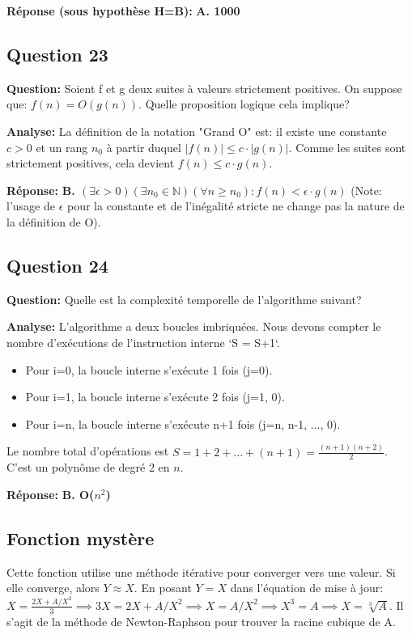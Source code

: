 \documentclass[12pt,a4paper]{article}
\begin{document}
\textbf{Réponse (sous hypothèse H=B):} \textbf{A. 1000}

\subsection{Question 23}
\textbf{Question:} Soient f et g deux suites à valeurs strictement positives. On suppose que: $f(n)=O(g(n))$. Quelle proposition logique cela implique?

\textbf{Analyse:} La définition de la notation "Grand O" est: il existe une constante $c > 0$ et un rang $n_0$ à partir duquel $|f(n)| \le c \cdot |g(n)|$. Comme les suites sont strictement positives, cela devient $f(n) \le c \cdot g(n)$.

\textbf{Réponse:} \textbf{B. $(\exists \epsilon > 0)(\exists n_0 \in \mathbb{N})(\forall n \ge n_0): f(n) < \epsilon \cdot g(n)$} (Note: l'usage de $\epsilon$ pour la constante et de l'inégalité stricte ne change pas la nature de la définition de O).

\subsection{Question 24}
\textbf{Question:} Quelle est la complexité temporelle de l'algorithme suivant?

\textbf{Analyse:} L'algorithme a deux boucles imbriquées. Nous devons compter le nombre d'exécutions de l'instruction interne `S = S+1`.
\begin{itemize}
    \item Pour i=0, la boucle interne s'exécute 1 fois (j=0).
    \item Pour i=1, la boucle interne s'exécute 2 fois (j=1, 0).
    \item Pour i=n, la boucle interne s'exécute n+1 fois (j=n, n-1, ..., 0).
\end{itemize}
Le nombre total d'opérations est $S = 1 + 2 + \dots + (n+1) = \frac{(n+1)(n+2)}{2}$. C'est un polynôme de degré 2 en $n$.

\textbf{Réponse:} \textbf{B. O($n^2$)}

\subsection{Fonction mystère}
Cette fonction utilise une méthode itérative pour converger vers une valeur. Si elle converge, alors $Y \approx X$.
En posant $Y=X$ dans l'équation de mise à jour:
$X = \frac{2X + A/X^2}{3} \implies 3X = 2X + A/X^2 \implies X = A/X^2 \implies X^3 = A \implies X = \sqrt[3]{A}$.
Il s'agit de la méthode de Newton-Raphson pour trouver la racine cubique de A.
\end{document}
